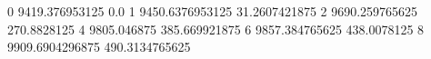 0 9419.376953125 0.0
1 9450.6376953125 31.2607421875
2 9690.259765625 270.8828125
4 9805.046875 385.669921875
6 9857.384765625 438.0078125
8 9909.6904296875 490.3134765625
